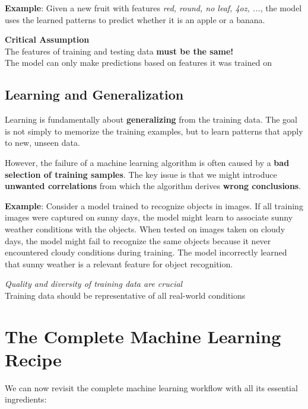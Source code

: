 \documentclass[11pt,a4paper]{article}
\theoremstyle{definition}
\theoremstyle{plain}
\theoremstyle{remark}
\begin{document}
\textbf{Example}: Given a new fruit with features \textit{red, round, no leaf, 4oz, ...}, the model uses the learned patterns to predict whether it is an apple or a banana.

\begin{center}
\colorbox{red!15}{\parbox{0.9\textwidth}{
\centering
\textbf{Critical Assumption}\\[0.2cm]
The features of training and testing data \textbf{must be the same!}\\[0.1cm]
The model can only make predictions based on features it was trained on
}}
\end{center}

\subsection{Learning and Generalization}

Learning is fundamentally about \textbf{generalizing} from the training data. The goal is not simply to memorize the training examples, but to learn patterns that apply to new, unseen data.

However, the failure of a machine learning algorithm is often caused by a \textbf{bad selection of training samples}. The key issue is that we might introduce \textbf{unwanted correlations} from which the algorithm derives \textbf{wrong conclusions}.

\textbf{Example}: Consider a model trained to recognize objects in images. If all training images were captured on sunny days, the model might learn to associate sunny weather conditions with the objects. When tested on images taken on cloudy days, the model might fail to recognize the same objects because it never encountered cloudy conditions during training. The model incorrectly learned that sunny weather is a relevant feature for object recognition.

\begin{center}
\colorbox{blue!10}{\parbox{0.85\textwidth}{
\centering
\textit{Quality and diversity of training data are crucial}\\[0.1cm]
Training data should be representative of all real-world conditions
}}
\end{center}

\section{The Complete Machine Learning Recipe}

We can now revisit the complete machine learning workflow with all its essential ingredients:
\end{document}
